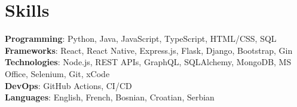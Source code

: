\section{Skills}
    \begin{itemize}[leftmargin=0.15in, label={}]
	\small{\item{
		\textbf{Programming}{: Python, Java, JavaScript, TypeScript, HTML/CSS, SQL} \\
		\textbf{Frameworks}{: React, React Native, Express.js, Flask, Django, Bootstrap, Gin} \\
		\textbf{Technologies}{: Node.js, REST APIs, GraphQL, SQLAlchemy, MongoDB, MS Office, Selenium, Git, xCode} \\
		\textbf{DevOps}{: GitHub Actions, CI/CD} \\
		\textbf{Languages}{: English, French, Bosnian, Croatian, Serbian} \\
	}}
    \end{itemize}

